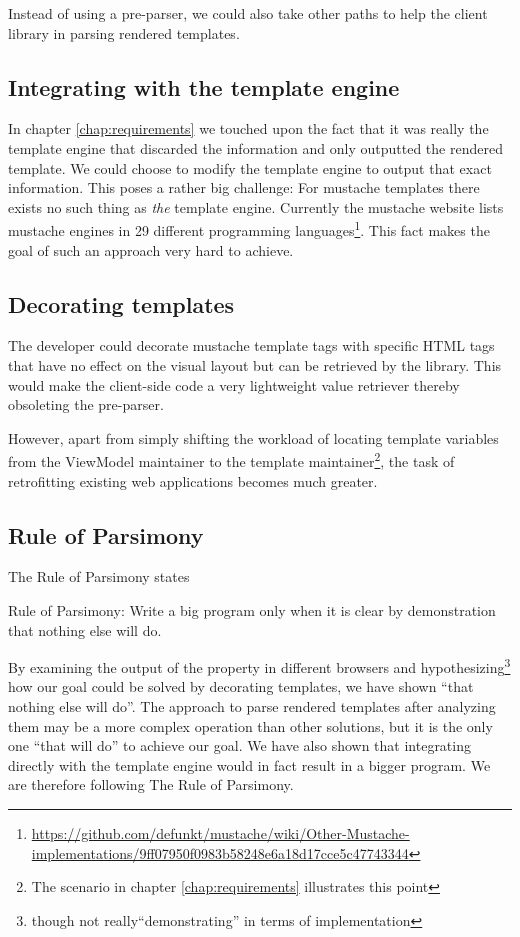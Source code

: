 \documentclass[thesis.tex]{subfiles}
\begin{document}
Instead of using a pre-parser, we could also take other paths to help
the client library in parsing rendered templates.

\subsection{Integrating with the template engine}
\label{sec:integrate-tpl-engine}
In chapter \ref{chap:requirements} we touched upon the fact that it was really
the template engine that discarded the information and only outputted the
rendered template. We could choose to modify the template engine to output that
exact information. This poses a rather big challenge:
For mustache templates there exists no such thing as \emph{the} template engine.
Currently the mustache website lists mustache engines in 29 different
programming languages\footnote{\url{https://github.com/defunkt/mustache/wiki/Other-Mustache-implementations/9ff07950f0983b58248e6a18d17cce5c47743344}}.
This fact makes the goal of such an approach very hard to achieve.

\subsection{Decorating templates}

The developer could decorate mustache template tags with specific HTML tags that
have no effect on the visual layout but can be retrieved by the library.
This would make the client-side code a very lightweight value retriever
thereby obsoleting the pre-parser.

However, apart from simply shifting the workload of locating template variables
from the ViewModel maintainer to the template maintainer\footnote{The scenario
in chapter \ref{chap:requirements} illustrates this point},
the task of retrofitting existing web applications becomes much greater.

\subsection{Rule of Parsimony}
\label{sec:parsimony}
The Rule of Parsimony states
\begin{citequote}{\cite[Chapter 1]{UXART}}
Rule of Parsimony: Write a big program only when it is clear by demonstration
that nothing else will do.
\end{citequote}

By examining the output of the  property in different browsers
and hypothesizing\footnote{though not really``demonstrating'' in terms of
implementation} how our goal could be solved by decorating templates,
we have shown ``that nothing else will do''.
The approach to parse rendered templates after analyzing them may be a
more complex operation than other solutions, but it is the only one
``that will do'' to achieve our goal. We have also shown that integrating
directly with the template engine would in fact result in a bigger program.
We are therefore following The Rule of Parsimony.
\end{document}
